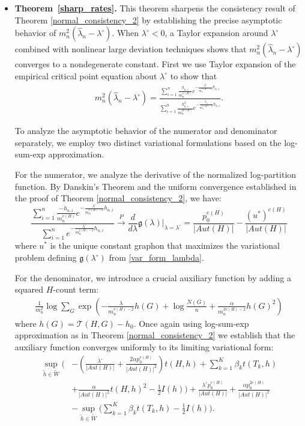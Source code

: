 \documentclass[12pt]{article}
\numberwithin{equation}{section}
\begin{document}
\begin{itemize}
    
    \item \textbf{Theorem~\ref{sharp_rates}.} This theorem sharpens the consistency result of Theorem \ref{normal_consistency_2} by establishing the precise asymptotic behavior of $m_n^2(\hat{\lambda}_n-\lambda^{\circ})$. When $\lambda^{\circ}<0$, a Taylor expansion around
    $\lambda^{\circ}$ combined with nonlinear large deviation techniques shows that
    $m_n^2(\hat{\lambda}_n-\lambda^{\circ})$ converges to a nondegenerate constant.
First we use Taylor expansion of the empirical critical point equation about $\lambda^{\circ}$ to show that
\begin{align*}
 m_n^2(\hat{\lambda}_n - \lambda^{\circ}) = \frac{\sum\limits_{i=1}^{n}\frac{h_{n,i}}{m_n^{v(H)}}e^{-\frac{\lambda^{\circ}}{m_n^{v(H)-2}}h_{n,i}}}{\sum\limits_{i=1}^{n}\frac{h_{n,i}^2}{m_n^{2v(H)}}e^{-\frac{\tilde{\lambda}_n}{m_n^{v(H)-2}}h_{n,i}} }.
\end{align*}

To analyze the asymptotic behavior of the numerator and denominator separately, we employ two distinct variational formulations based on the log-sum-exp approximation.

For the numerator, we analyze the derivative of the normalized log-partition function. By Danskin's Theorem \cite{danskin1966theory} and the uniform convergence established in the proof of Theorem \ref{normal_consistency_2}, we have:
\begin{equation}
\frac{\sum\limits_{i=1}^{n}\frac{-h_{n,i}}{m_n^{v(H)}}e^{-\frac{\lambda^{\circ}}{m_n^{v(H)-2}}h_{n,i}}}{\sum\limits_{i=1}^{n}e^{-\frac{\lambda^{\circ}}{m_n^{v(H)-2}}h_{n,i}}} \xrightarrow{P} \frac{d}{d\lambda} \mathfrak{g}(\lambda) \bigg|_{\lambda=\lambda^{\circ}} = \frac{p_0^{e(H)}}{|Aut(H)|} - \frac{(u^*)^{e(H)}}{|Aut(H)|}
\label{num_conv}\end{equation}
where $u^*$ is the unique constant graphon that maximizes the variational problem defining $\mathfrak{g}(\lambda^\circ)$ from \eqref{var_form_lambda}.

For the denominator, we introduce a crucial auxiliary function by adding a squared $H$-count term:
\begin{align*}
\frac{1}{m_n^2} \log \sum_{G} \exp\left(-\frac{\lambda}{m_n^{v(H)-2}} h(G) + \log \frac{N(G)}{n} + \frac{\alpha}{m_n^{2v(H)-2}} h(G)^2\right)
\end{align*}
where $h(G) = \mathcal{T}(H,G) - h_0$. Once again using log-sum-exp approximation as in Theorem \ref{normal_consistency_2} we establish that the auxiliary function converges uniformly to its limiting variational form:
    \begin{align*}
     \sup_{\tilde{h}\in\tilde{W}}\bigg(&-\left(\frac{\lambda^{\circ}}{|Aut(H)|}+\frac{2\alpha p_0^{e(H)}}{|Aut(H)|^2}\right) t(H,h) + \sum_{k=1}^K \beta_k t(T_k, h) \\
     &+ \frac{\alpha}{|Aut(H)|^2} t(H,h)^2 - \frac{1}{2} I(h)\bigg) + \frac{\lambda^{\circ} p_0^{e(H)}}{\lvert Aut(H)\rvert} + \frac{\alpha p_0^{2e(H)}}{\lvert Aut(H)\rvert^2} \\&- \sup_{\tilde{h}\in\tilde{W}}\bigg( \sum_{k=1}^K \beta_k t(T_k, h) 
      - \frac{1}{2} I(h)\bigg).
    \end{align*}


\end{itemize}
\end{document}
